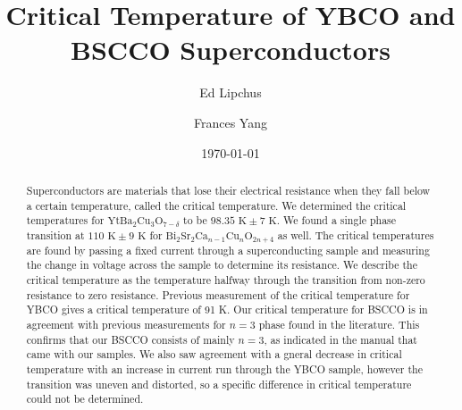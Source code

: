 \documentclass[prb,preprint]{revtex4-1}
\begin{document}

\title{Critical Temperature of YBCO and BSCCO Superconductors}

\author{Ed Lipchus}



\author{Frances Yang}


\date{\today}

\begin{abstract}

Superconductors are materials that lose their electrical resistance when they fall below a certain temperature, called the critical temperature. We determined the critical temperatures for $\text{Yt}\text{Ba}_{2}\text{Cu}_{3}\text{O}_{7-\delta}$ to be $98.35\textrm{ K} \pm 7\textrm{ K}$. We found a single phase transition at $110\text{ K}\pm 9 \text{ K}$ for $\text{Bi}_{2}\text{Sr}_{2}\text{Ca}_{n-1}\text{Cu}_{n}\text{O}_{2n+4}$ as well.
The critical temperatures are found by passing a fixed current through a superconducting sample and measuring the change in voltage across the sample to determine its resistance. We describe the critical temperature as the temperature halfway through the transition from non-zero resistance to zero resistance. Previous measurement of the critical temperature for YBCO gives a critical temperature of 91 K. Our critical temperature for BSCCO is in agreement with previous measurements for $n=3$ phase found in the literature. This confirms that our BSCCO consists of mainly $n=3$, as indicated in the manual that came with our samples. We also saw agreement with a gneral decrease in critical temperature with an increase in current run through the YBCO sample, however the transition was uneven and distorted, so a specific difference in critical temperature could not be determined.


\end{abstract}
\end{document}
